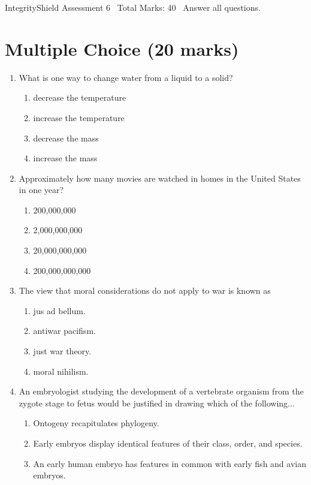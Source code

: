 \documentclass[12pt]{article}
\begin{document}
\begin{center}
IntegrityShield Assessment 6 \
Total Marks: 40 \
Answer all questions.
\end{center}

\section*{Multiple Choice (20 marks)}
\begin{enumerate}[label=\arabic*.]
\item What is one way to change water from a liquid to a solid?
\begin{enumerate}[label=(\alph*)]
    \item decrease the temperature
    \item increase the temperature
    \item decrease the mass
    \item increase the mass
\end{enumerate}
\item Approximately how many movies are watched in homes in the United States in one year?
\begin{enumerate}[label=(\alph*)]
    \item 200,000,000
    \item 2,000,000,000
    \item 20,000,000,000
    \item 200,000,000,000
\end{enumerate}
\item The view that moral considerations do not apply to war is known as
\begin{enumerate}[label=(\alph*)]
    \item jus ad bellum.
    \item antiwar pacifism.
    \item just war theory.
    \item moral nihilism.
\end{enumerate}
\item An embryologist studying the development of a vertebrate organism from the zygote stage to fetus would be justified in drawing which of the following...
\begin{enumerate}[label=(\alph*)]
    \item Ontogeny recapitulates phylogeny.
    \item Early embryos display identical features of their class, order, and species.
    \item An early human embryo has features in common with early fish and avian embryos.

\end{enumerate}
\end{enumerate}
\end{document}

